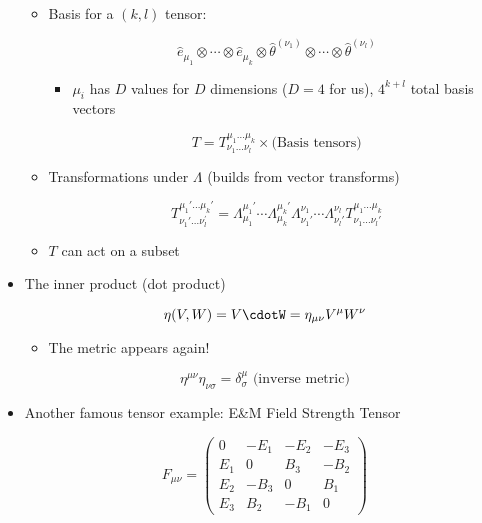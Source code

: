 \begin{itemize}
\begin{itemize}
      \item Basis for a $(k,l)$ tensor:

        $$\hat{e}_{\mu_1}\otimes\cdots\otimes\hat{e}_{\mu_k}\otimes\hat{\theta}^{(\nu_1)}\otimes\cdots\otimes\hat{\theta}^{(\nu_l)}$$

        \begin{itemize}

          \item $\mu_i$ has $D$ values for $D$ dimensions ($D=4$ for us), $4^{k+l}$ total basis vectors

        \end{itemize}

        $$T=T^{\mu_1\ldots\mu_k}_{\nu_1\ldots\nu_l}\times\text{(Basis tensors)}$$

      \item Transformations under $\Lambda$ (builds from vector transforms)

        $$T^{\mu_1'\ldots\mu_k'}_{\nu_1'\ldots\nu_l^'}=\Lambda^{\mu_1'}_{\mu_1}\cdots\Lambda^{\mu_k'}_{\mu_k}\Lambda^{\nu_1}_{\nu_1'}\cdots\Lambda^{\nu_l}_{\nu_l'}T^{\mu_1\ldots\mu_k}_{\nu_1\ldots\nu_l'}$$

      \item $T$ can act on a subset

    \end{itemize}

  \item The inner product (dot product)

    $$\eta(V,W)=V\cdotW=\eta_{\mu\nu}V^{\mu}W^{\nu}$$

    \begin{itemize}

      \item The metric appears again!

    \end{itemize}

    $$\eta^{\mu\nu}\eta_{\nu\sigma}=\delta^{\mu}_{\sigma}\text{ (inverse metric)}$$

  \item Another famous tensor example: E\&M Field Strength Tensor

    $$F_{\mu\nu}=\left( \begin{array}{cccc} 0 & -E_1 & -E_2 & -E_3\\E_1& 0 & B_3 & -B_2\\ E_2 & -B_3 & 0 & B_1\\ E_3 & B_2 & -B_1 & 0\end{array} \right)$$


\end{itemize}
